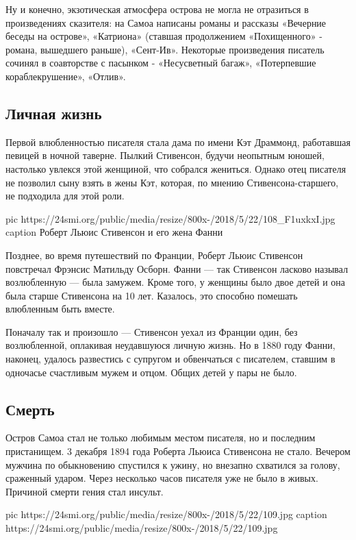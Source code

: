 Ну и конечно, экзотическая атмосфера острова не могла не отразиться в
произведениях сказителя: на Самоа написаны романы и рассказы «Вечерние
беседы на острове», «Катриона» (ставшая продолжением «Похищенного» -
романа, вышедшего раньше), «Сент-Ив». Некоторые произведения писатель
сочинял в соавторстве с пасынком - «Несусветный багаж», «Потерпевшие
кораблекрушение», «Отлив».

\subsection{Личная жизнь}

Первой влюбленностью писателя стала дама по имени Кэт Драммонд, работавшая
певицей в ночной таверне. Пылкий Стивенсон, будучи неопытным юношей,
настолько увлекся этой женщиной, что собрался жениться. Однако отец
писателя не позволил сыну взять в жены Кэт, которая, по мнению
Стивенсона-старшего, не подходила для этой роли.

\ifcmt
pic https://24smi.org/public/media/resize/800x-/2018/5/22/108_F1uxkxI.jpg
caption Роберт Льюис Стивенсон и его жена Фанни
\fi

Позднее, во время путешествий по Франции, Роберт Льюис Стивенсон
повстречал Фрэнсис Матильду Осборн. Фанни — так Стивенсон ласково называл
возлюбленную — была замужем. Кроме того, у женщины было двое детей и она
была старше Стивенсона на 10 лет. Казалось, это способно помешать
влюбленным быть вместе.

Поначалу так и произошло — Стивенсон уехал из Франции один, без
возлюбленной, оплакивая неудавшуюся личную жизнь. Но в 1880 году Фанни,
наконец, удалось развестись с супругом и обвенчаться с писателем, ставшим
в одночасье счастливым мужем и отцом. Общих детей у пары не было.

\subsection{Смерть}

   Остров Самоа стал не только любимым местом писателя, но и последним
   пристанищем. 3 декабря 1894 года Роберта Льюиса Стивенсона не стало.
   Вечером мужчина по обыкновению спустился к ужину, но внезапно схватился за
   голову, сраженный ударом. Через несколько часов писателя уже не было в
   живых. Причиной смерти гения стал инсульт.

\ifcmt
pic https://24smi.org/public/media/resize/800x-/2018/5/22/109.jpg
caption https://24smi.org/public/media/resize/800x-/2018/5/22/109.jpg
\fi


